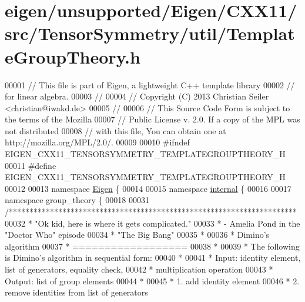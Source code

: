 \hypertarget{eigen_2unsupported_2_eigen_2_c_x_x11_2src_2_tensor_symmetry_2util_2_template_group_theory_8h_source}{}\section{eigen/unsupported/\+Eigen/\+C\+X\+X11/src/\+Tensor\+Symmetry/util/\+Template\+Group\+Theory.h}
\label{eigen_2unsupported_2_eigen_2_c_x_x11_2src_2_tensor_symmetry_2util_2_template_group_theory_8h_source}

\begin{DoxyCode}
00001 \textcolor{comment}{// This file is part of Eigen, a lightweight C++ template library}
00002 \textcolor{comment}{// for linear algebra.}
00003 \textcolor{comment}{//}
00004 \textcolor{comment}{// Copyright (C) 2013 Christian Seiler <christian@iwakd.de>}
00005 \textcolor{comment}{//}
00006 \textcolor{comment}{// This Source Code Form is subject to the terms of the Mozilla}
00007 \textcolor{comment}{// Public License v. 2.0. If a copy of the MPL was not distributed}
00008 \textcolor{comment}{// with this file, You can obtain one at http://mozilla.org/MPL/2.0/.}
00009 
00010 \textcolor{preprocessor}{#ifndef EIGEN\_CXX11\_TENSORSYMMETRY\_TEMPLATEGROUPTHEORY\_H}
00011 \textcolor{preprocessor}{#define EIGEN\_CXX11\_TENSORSYMMETRY\_TEMPLATEGROUPTHEORY\_H}
00012 
00013 \textcolor{keyword}{namespace }\hyperlink{namespace_eigen}{Eigen} \{
00014 
00015 \textcolor{keyword}{namespace }\hyperlink{namespaceinternal}{internal} \{
00016 
00017 \textcolor{keyword}{namespace }group\_theory \{
00018 
00031 \textcolor{comment}{/**********************************************************************}
00032 \textcolor{comment}{ *                "Ok kid, here is where it gets complicated."}
00033 \textcolor{comment}{ *                         - Amelia Pond in the "Doctor Who" episode}
00034 \textcolor{comment}{ *                           "The Big Bang"}
00035 \textcolor{comment}{ *}
00036 \textcolor{comment}{ * Dimino's algorithm}
00037 \textcolor{comment}{ * ==================}
00038 \textcolor{comment}{ *}
00039 \textcolor{comment}{ * The following is Dimino's algorithm in sequential form:}
00040 \textcolor{comment}{ *}
00041 \textcolor{comment}{ * Input: identity element, list of generators, equality check,}
00042 \textcolor{comment}{ *        multiplication operation}
00043 \textcolor{comment}{ * Output: list of group elements}
00044 \textcolor{comment}{ *}
00045 \textcolor{comment}{ * 1. add identity element}
00046 \textcolor{comment}{ * 2. remove identities from list of generators}

\end{DoxyCode}
